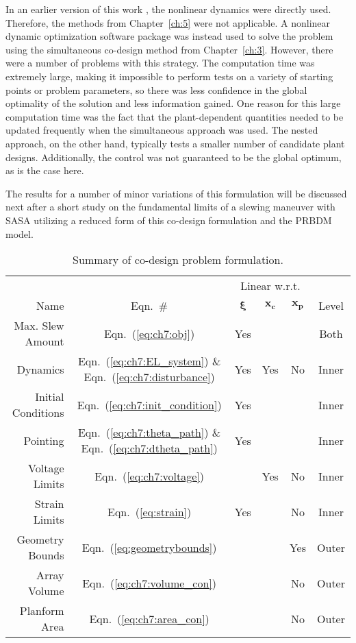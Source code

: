 In an earlier version of this work \cite{Chilan2016a}, the nonlinear dynamics were directly used. Therefore, the methods from Chapter~\ref{ch:5} were not applicable. A nonlinear dynamic optimization software package was instead used to solve the problem using the simultaneous co-design method from Chapter~\ref{ch:3}.
However, there were a number of problems with this strategy. The computation time was extremely large, making it impossible to perform tests on a variety of starting points or problem parameters, so there was less confidence in the global optimality of the solution and less information gained. One reason for this large computation time was the fact that the plant-dependent quantities needed to be updated frequently when the simultaneous approach was used. The nested approach, on the other hand, typically tests a smaller number of candidate plant designs.
Additionally, the control was not guaranteed to be the global optimum, as is the case here.

The results for a number of minor variations of this formulation will be discussed next after a short study on the fundamental limits of a slewing maneuver with SASA utilizing a reduced form of this co-design formulation and the PRBDM model. 

\begin{table}
\caption{Summary of co-design problem formulation. \label{tb:ch7:codesign_summary}}
\centering
\begin{tabular}{rccccc}
\hline \hline
& & \multicolumn{3}{c}{Linear w.r.t.} & \\
Name & Eqn.~\# & $\bm{\xi}$ & $ \bm{x_c}$ & $\bm{x_p}$ & Level \\
\hline
Max. Slew Amount & Eqn.~(\ref{eq:ch7:obj}) & Yes & & & Both \\
Dynamics & Eqn.~(\ref{eq:ch7:EL_system}) \& Eqn.~(\ref{eq:ch7:disturbance}) & Yes & Yes & No & Inner \\
Initial Conditions & Eqn.~(\ref{eq:ch7:init_condition}) & Yes & & & Inner \\
Pointing & Eqn.~(\ref{eq:ch7:theta_path}) \& Eqn.~(\ref{eq:ch7:dtheta_path}) & Yes & & & Inner \\
Voltage Limits & Eqn.~(\ref{eq:ch7:voltage}) & & Yes &  No & Inner \\
Strain Limits & Eqn.~(\ref{eq:strain}) & Yes & & No & Inner  \\
Geometry Bounds & Eqn.~(\ref{eq:geometrybounds}) & & & Yes & Outer \\
Array Volume & Eqn.~(\ref{eq:ch7:volume_con}) & &  & No & Outer \\
Planform Area & Eqn.~(\ref{eq:ch7:area_con}) & & & No & Outer \\
\hline \hline
\end{tabular}
\end{table}

